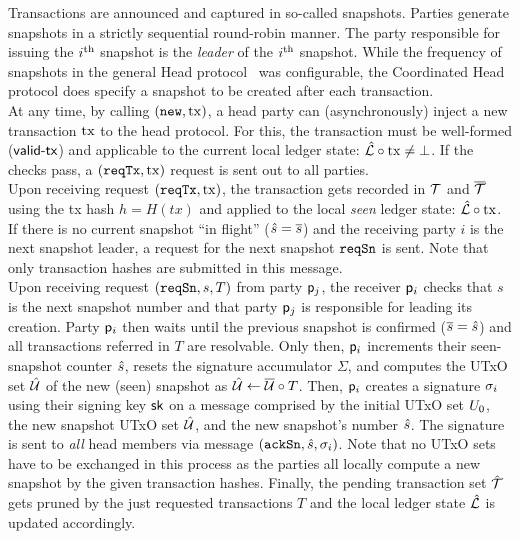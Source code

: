 Transactions are announced and captured in so-called snapshots. Parties generate
snapshots in a strictly sequential round-robin manner. The party responsible for
issuing the $i^{\text{th}}$ snapshot is the \emph{leader} of the $i^{\text{th}}$ snapshot.
While the frequency of snapshots in the general Head protocol~\cite{hydrahead20}
was configurable, the Coordinated Head protocol does specify a snapshot to be
created after each transaction.\\

\quad At any time, by calling $(\mathtt{new},\mathrm{tx})$, a head
party can (asynchronously) inject a new transaction $\mathrm{tx}$ to the head protocol.
For this, the transaction must be well-formed ($\mathsf{valid\textsf{-}{}tx}$) and applicable to the
current local ledger state: $\hat {\mathcal L} \circ \mathrm{tx} \neq \bot$. If the checks
pass, a $(\mathtt{reqTx},\mathrm{tx})$ request is sent out to all parties.\\

\quad Upon receiving request $(\mathtt{reqTx},\mathrm{tx})$, the transaction
gets recorded in ${\mathcal T}$ and $\overline {\mathcal T}$ using the tx hash $h = H(tx)$ and applied
to the local \emph{seen} ledger state: $\hat {\mathcal L} \circ \mathrm{tx}$. If there is no
current snapshot ``in flight'' ($\hat s = \overline s$) and the receiving party $i$ is
the next snapshot leader, a request for the next snapshot $\mathtt{reqSn}$ is sent. Note that only transaction hashes are submitted in this message.\\

\quad Upon receiving request $(\mathtt{reqSn},s,T)$ from party
$\mathsf p_j$, the receiver $\mathsf p_i$ checks that $s$ is the next snapshot number
and that party $\mathsf p_j$ is responsible for leading its creation. Party
$\mathsf p_i$ then waits until the previous snapshot is confirmed ($\overline s = \hat s$)
and all transactions referred in $T$  are
resolvable. Only then, $\mathsf p_i$ increments their seen-snapshot counter $\hat s$,
resets the signature accumulator $\Sigma$, and computes the UTxO set $\hat {\mathcal U}$ of
the new (seen) snapshot as $\hat {\mathcal U} \gets \overline {\mathcal U} \circ T$. Then, $\mathsf p_i$
creates a signature $\sigma_i$ using their signing key $\mathsf{sk}$ on a message
comprised by the initial UTxO set $U_{0}$, the new snapshot UTxO set $\hat {\mathcal U}$,
and the new snapshot's number $\hat s$. The signature is sent to \emph{all} head
members via message $(\mathtt{ackSn},\hat s,\sigma_i)$. Note that no UTxO sets have to be
exchanged in this process as the parties all locally compute a new snapshot by
the given transaction hashes. Finally, the pending transaction set $\hat {\mathcal T}$ gets
pruned by the just requested transactions $T$ and the local ledger state
$\hat {\mathcal L}$ is updated accordingly.\\

